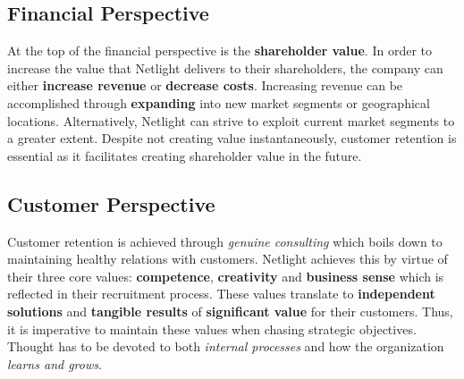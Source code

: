\documentclass[12pt]{article}
\begin{document}
\subsection*{Financial Perspective}
At the top of the financial perspective is the \textbf{shareholder value}. In 
order to increase the value that Netlight delivers to their shareholders, the company can either \textbf{increase revenue} or \textbf{decrease costs}. Increasing revenue can be accomplished through \textbf{expanding} into new market segments or geographical locations. Alternatively, Netlight can strive to exploit current market segments to a greater extent. Despite not creating value instantaneously, customer retention is essential as it facilitates creating shareholder value in the future.

\subsection*{Customer Perspective}
Customer retention is achieved through \textit{genuine consulting} which boils down to maintaining healthy relations with customers. Netlight achieves this by virtue of their three core values: \textbf{competence}, \textbf{creativity} and \textbf{business sense} which is reflected in their recruitment process. These values translate to \textbf{independent solutions} and \textbf{tangible results} of \textbf{significant value} for their customers. Thus, it is imperative to maintain these values when chasing strategic objectives. Thought has to be devoted to both \textit{internal processes} and how the organization \textit{learns and grows}.
\end{document}
